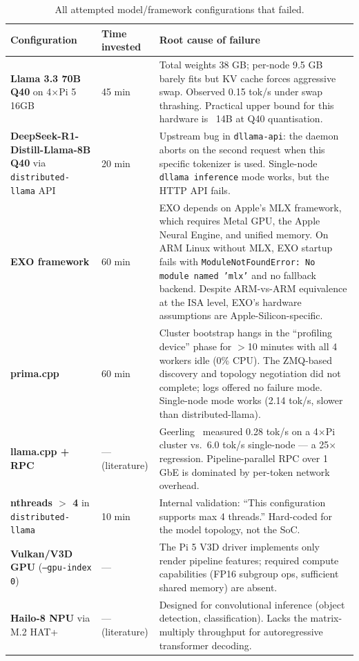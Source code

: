 \documentclass[11pt,a4paper]{article}
\begin{document}
\begin{table}[H]
\centering
\caption{All attempted model/framework configurations that failed.}
\scriptsize
\begin{tabular}{p{3.5cm}p{2cm}p{9cm}}
\toprule
\textbf{Configuration} & \textbf{Time invested} & \textbf{Root cause of failure} \\
\midrule
\textbf{Llama 3.3 70B Q40} on 4$\times$Pi 5 16GB & 45 min & Total weights 38 GB; per-node 9.5 GB barely fits but KV cache forces aggressive swap. Observed 0.15 tok/s under swap thrashing. Practical upper bound for this hardware is ~14B at Q40 quantisation. \\
\textbf{DeepSeek-R1-Distill-Llama-8B Q40} via \texttt{distributed-llama} API & 20 min & Upstream bug in \texttt{dllama-api}: the daemon aborts on the second request when this specific tokenizer is used. Single-node \texttt{dllama inference} mode works, but the HTTP API fails. \\
\textbf{EXO framework} \cite{exo2025} & 60 min & EXO depends on Apple's MLX framework, which requires Metal GPU, the Apple Neural Engine, and unified memory. On ARM Linux without MLX, EXO startup fails with \texttt{ModuleNotFoundError: No module named 'mlx'} and no fallback backend. Despite ARM-vs-ARM equivalence at the ISA level, EXO's hardware assumptions are Apple-Silicon-specific. \\
\textbf{prima.cpp} \cite{li2025prima} & 60 min & Cluster bootstrap hangs in the ``profiling device'' phase for $>$10 minutes with all 4 workers idle (0\% CPU). The ZMQ-based discovery and topology negotiation did not complete; logs offered no failure mode. Single-node mode works (2.14 tok/s, slower than distributed-llama). \\
\textbf{llama.cpp + RPC} & --- (literature) & Geerling~\cite{geerling2025} measured 0.28 tok/s on a 4$\times$Pi cluster vs.\ 6.0 tok/s single-node --- a 25$\times$ regression. Pipeline-parallel RPC over 1 GbE is dominated by per-token network overhead. \\
\textbf{nthreads $>$ 4} in \texttt{distributed-llama} & 10 min & Internal validation: ``This configuration supports max 4 threads.'' Hard-coded for the model topology, not the SoC. \\
\textbf{Vulkan/V3D GPU} (\texttt{--gpu-index 0}) & --- & The Pi 5 V3D driver implements only render pipeline features; required compute capabilities (FP16 subgroup ops, sufficient shared memory) are absent. \\
\textbf{Hailo-8 NPU} via M.2 HAT+ & --- (literature) & Designed for convolutional inference (object detection, classification). Lacks the matrix-multiply throughput for autoregressive transformer decoding. \\

\end{tabular}
\end{table}
\end{document}
